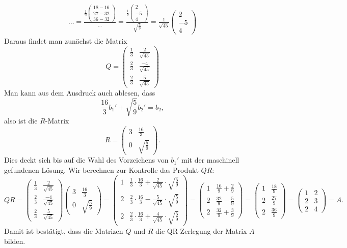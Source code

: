 \begin{loesung}
\begin{align*}
{}{\dots}
=\frac{\displaystyle\frac19\begin{pmatrix}18-16\\27-32\\36-32\end{pmatrix}}{\dots}
=\frac{\displaystyle\frac19\begin{pmatrix}2\\-5\\4\end{pmatrix}}{\sqrt{\frac{5}{9}}}
=\frac1{\sqrt{45}}\begin{pmatrix}2\\-5\\4\end{pmatrix}
\end{align*}
Daraus findet man zunächst die Matrix 
\[
Q
=
\begin{pmatrix}
\frac13&\frac{ 2}{\sqrt{45}}\\
\frac23&\frac{-4}{\sqrt{45}}\\
\frac23&\frac{ 5}{\sqrt{45}}
\end{pmatrix}
\]
Man kann aus dem Ausdruck auch ablesen, dass
\[
\frac{16}{3}b_1'+\sqrt{\frac{5}{9}}b_2'=b_2,
\]
also ist die $R$-Matrix
\[
R
=
\begin{pmatrix}
3&\frac{16}{3}\\
0&\sqrt{\frac{5}{9}}
\end{pmatrix}.
\]
Dies deckt sich bis auf die Wahl des Vorzeichens von $b_1'$ mit der
maschinell gefundenen Lösung.
Wir berechnen zur Kontrolle das Produkt $QR$:
\[
QR=
\begin{pmatrix}
\frac13&\frac{ 2}{\sqrt{45}}\\
\frac23&\frac{-4}{\sqrt{45}}\\
\frac23&\frac{ 5}{\sqrt{45}}
\end{pmatrix}
\begin{pmatrix}
3&\frac{16}{3}\\
0&\sqrt{\frac{5}{9}}
\end{pmatrix}
=
\begin{pmatrix}
1&\frac13\cdot \frac{16}{3}+\frac{2}{\sqrt{45}}\cdot\sqrt{\frac{5}{9}}\\
2&\frac23\cdot \frac{16}{3}-\frac{5}{\sqrt{45}}\cdot\sqrt{\frac{5}{9}}\\
2&\frac23\cdot \frac{16}{3}+\frac{4}{\sqrt{45}}\cdot\sqrt{\frac{5}{9}}
\end{pmatrix}
=
\begin{pmatrix}
1&\frac{16}{9}+\frac{2}{9}\\
2&\frac{32}{9}-\frac{5}{9}\\
2&\frac{32}{9}+\frac{3}{9}
\end{pmatrix}
=
\begin{pmatrix}
1&\frac{18}{9}\\
2&\frac{27}{9}\\
2&\frac{36}{9}
\end{pmatrix}
=
\begin{pmatrix}
1&2\\
2&3\\
2&4
\end{pmatrix}
=A.
\]
Damit ist bestätigt, dass die Matrizen $Q$ und $R$ die QR-Zerlegung der
Matrix $A$ bilden.
\end{loesung}

